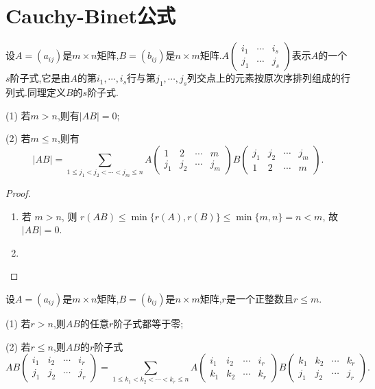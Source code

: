 \documentclass[../../main.tex]{subfiles}%
\begin{document}
\section{Cauchy-Binet公式}

\begin{theorem}\label{theorem:Cauchy-Binet公式}
设\(A=(a_{ij})\)是\(m\times n\)矩阵,\(B=(b_{ij})\)是\(n\times m\)矩阵.\(A\left(\begin{matrix}
i_1 & \cdots & i_s\\
j_1 & \cdots & j_s
\end{matrix}\right)\)表示\(A\)的一个\(s\)阶子式,它是由\(A\)的第\(i_1,\cdots,i_s\)行与第\(j_1,\cdots,j_s\)列交点上的元素按原次序排列组成的行列式.同理定义\(B\)的\(s\)阶子式.

(1) 若\(m > n\),则有\(\vert AB\vert=0\);

(2) 若\(m\leqslant  n\),则有
\[\vert AB\vert=\sum_{1\leqslant  j_1<j_2<\cdots<j_m\leqslant  n}A\left(\begin{matrix}
1 & 2 & \cdots & m\\
j_1 & j_2 & \cdots & j_m
\end{matrix}\right)B\left(\begin{matrix}
j_1 & j_2 & \cdots & j_m\\
1 & 2 & \cdots & m
\end{matrix}\right).\]
\end{theorem}
\begin{proof}
\begin{enumerate}[(1)]
\item 若 \(m > n\), 则 \(r(AB) \leqslant  \min\{r(A), r(B)\} \leqslant  \min\{m, n\} = n < m\), 故 \(|AB| = 0\).

\item 
\end{enumerate}
\end{proof}

\begin{corollary}\label{corollary:Cauchy-Binet公式推论}
设\(A=(a_{ij})\)是\(m\times n\)矩阵,\(B=(b_{ij})\)是\(n\times m\)矩阵,\(r\)是一个正整数且\(r\leqslant  m\).

(1) 若\(r > n\),则\(AB\)的任意\(r\)阶子式都等于零;

(2) 若\(r\leqslant  n\),则\(AB\)的\(r\)阶子式
\[AB\left(\begin{matrix}
i_1 & i_2 & \cdots & i_r\\
j_1 & j_2 & \cdots & j_r
\end{matrix}\right)=\sum_{1\leqslant  k_1<k_2<\cdots<k_r\leqslant  n}A\left(\begin{matrix}
i_1 & i_2 & \cdots & i_r\\
k_1 & k_2 & \cdots & k_r
\end{matrix}\right)B\left(\begin{matrix}
k_1 & k_2 & \cdots & k_r\\
j_1 & j_2 & \cdots & j_r
\end{matrix}\right).\]
\end{corollary}
\end{document}
